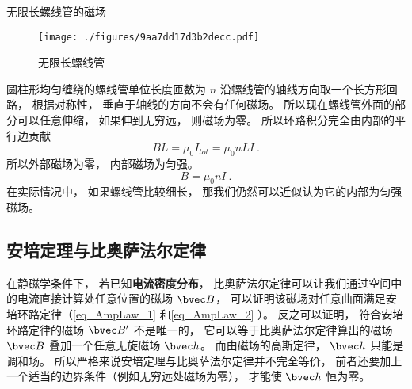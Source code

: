 \begin{example}{无限长螺线管的磁场}\label{ex_AmpLaw_2}
\begin{figure}[ht]
\centering
\texttt{[image: ./figures/9aa7dd17d3b2decc.pdf]}
\caption{无限长螺线管} \label{fig_AmpLaw_1}
\end{figure}
圆柱形均匀缠绕的螺线管单位长度匝数为 $n$ 沿螺线管的轴线方向取一个长方形回路， 根据对称性， 垂直于轴线的方向不会有任何磁场。 所以现在螺线管外面的部分可以任意伸缩， 如果伸到无穷远， 则磁场为零。 所以环路积分完全由内部的平行边贡献
\begin{equation}
BL = \mu_0 I_{tot} = \mu_0 nLI~.
\end{equation}
所以外部磁场为零， 内部磁场为匀强。
\begin{equation}
B = \mu_0 nI~.
\end{equation}
在实际情况中， 如果螺线管比较细长， 那我们仍然可以近似认为它的内部为匀强磁场。
\end{example}

\subsection{安培定理与比奥萨法尔定律}

在静磁学条件下， 若已知\textbf{电流密度分布}， 比奥萨法尔定律可以让我们通过空间中的电流直接计算处任意位置的磁场 $\bvec B$， 可以证明该磁场对任意曲面满足安培环路定律（\autoref{eq_AmpLaw_1} 和\autoref{eq_AmpLaw_2} ）。 反之可以证明， 符合安培环路定律的磁场 $\bvec B'$ 不是唯一的， 它可以等于比奥萨法尔定律算出的磁场 $\bvec B$ 叠加一个任意无旋磁场 $\bvec h$。 而由磁场的高斯定律， $\bvec h$ 只能是调和场。 所以严格来说安培定理与比奥萨法尔定律并不完全等价， 前者还要加上一个适当的边界条件（例如无穷远处磁场为零）， 才能使 $\bvec h$ 恒为零。
